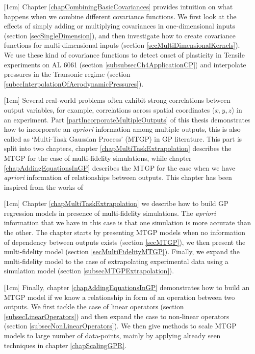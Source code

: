 [1cm]
Chapter \ref{chapCombiningBasicCovariances} provides intuition on what happens when we combine different covariance functions. We first look at the effects of simply adding or multiplying covariances in one-dimensional inputs (section \ref{secSingleDimension}), and then investigate how to create covariance functions for multi-dimensional inputs (section \ref{secMultiDimensionalKernels}). We use these kind of covariance functions to detect onset of plasticity in Tensile experiments on AL 6061 (section \ref{subsubsecCh4ApplicationCP}) and interpolate pressures in the Transonic regime (section \ref{subecInterpolationOfAerodynamicPressures}). 

[1cm]
Several real-world problems often exhibit strong correlations between output variables, for example, correlations across spatial coordinates ($x, y, z$) in an experiment. Part \ref{partIncorporateMultipleOutputs} of this thesis demonstrates how to incorporate an \textit{apriori} information among multiple outputs, this is also called as `Multi-Task Gaussian Process' (MTGP) in GP literature. This part is split into two chapters, chapter \ref{chapMultiTaskExtrapolation} describes the MTGP for the case of multi-fidelity simulations, while chapter \ref{chapAddingEquationsInGP} describes the MTGP for the case when we have \textit{apriori} information of relationships between outputs. This chapter has been inspired from the works of \cite{forrester2007multi, alvarez2011kernels, bonilla_multi-task_2008, Boyle05dependentgaussian, kennedy2000predicting, le2013multi, Constantinescu2013, journals/jmlr/AlvarezLL09, jidling2017linearly, ginsbourger2013invariances, sarkka2011linear}

[1cm]
Chapter \ref{chapMultiTaskExtrapolation} we describe how to build GP regression models in presence of multi-fidelity simulations. The \textit{apriori} information that we have in this case is that one simulation is more accurate than the other. The chapter starts by presenting MTGP models when no information of dependency between outputs exists (section \ref{secMTGP}), we then present the multi-fidelity model (section \ref{secMultiFidelityMTGP}). Finally, we expand the multi-fidelity model to the case of extrapolating experimental data using a simulation model (section \ref{subsecMTGPExtrapolation}). 

[1cm]
Finally, chapter \ref{chapAddingEquationsInGP} demonstrates how to build an MTGP model if we know a relationship in form of an operation between two outputs. We first tackle the case of linear operators (section \ref{subsecLinearOperators}) and then expand the case to non-linear operators (section \ref{subsecNonLinearOperators}). We then give methods to scale MTGP models to large number of data-points, mainly by applying already seen techniques in chapter \ref{chapScalingGPR}. 

